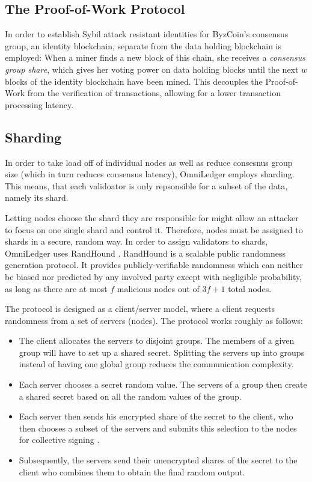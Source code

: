 \documentclass[11pt, a4paper, twoside, openright]{article} %
\begin{document}
\subsection{The Proof-of-Work Protocol}
In order to establish Sybil attack resistant identities for ByzCoin's
consensus group, an identity blockchain, separate from the data holding
blockchain is employed:
When a miner finds a new block of this chain, she receives a \textit{consensus
group share}, which gives her voting power on data holding blocks until the
next $w$ blocks of the identity blockchain have been mined.
This decouples the Proof-of-Work from the verification of transactions,
allowing for a lower transaction processing latency.\\

\subsection{Sharding}
In order to take load off of individual nodes as well as reduce consesnus group
size (which in turn reduces consensus latency), OmniLedger employs sharding.
This means, that each validoator is only repsonsible for a subset of the data,
namely its shard.

Letting nodes choose the shard they are responsible for might allow an
attacker to focus on one single shard and control it. Therefore, nodes must be
assigned to shards in a secure, random way.
In order to assign validators to shards, OmniLedger uses RandHound
\cite{syta2017randhound}.
RandHound is a scalable public randomness generation protocol.
It provides publicly-verifiable randomness which can neither be biased nor
predicted by any involved party except with negligible probability, as long as
there are at most $f$ malicious nodes out of $3f + 1$ total nodes.

The protocol is designed as a client/server model, where a client requests
randomness from a set of servers (nodes).
The protocol works roughly as follows:
\begin{itemize}
    \item The client allocates the servers to disjoint groups.
        The members of a given group will have to set up a shared secret.
        Splitting the servers up into groups instead of having one global
        group reduces the communication complexity.
    \item Each server chooses a secret random value. The servers of a group
        then create a shared secret based on all the random values of the
        group.
    \item Each server then sends his encrypted share of the secret to the
        client, who then chooses a subset of the servers and submits this
        selection to the nodes for collective signing \cite{Syta:221010}.
    \item Subsequently, the servers send their unencrypted shares of the
        secret to the client who combines them to obtain the final random
        output.
\end{itemize}
\end{document}
